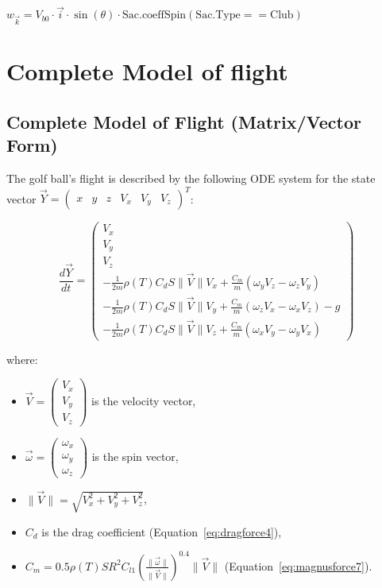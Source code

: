 \documentclass[10pt,a4paper]{report}
\begin{document}
$w_{\overrightarrow{k}} = V_{b0} \cdot \overrightarrow{i} \cdot \sin(\theta) \cdot \text{Sac.coeffSpin}(\text{Sac.Type} == \text{Club})$

\section{Complete Model of flight}
\subsection{Complete Model of Flight (Matrix/Vector Form)}
The golf ball's flight is described by the following ODE system for the state vector $\vec{Y} = \begin{pmatrix} x & y & z & V_x & V_y & V_z \end{pmatrix}^T$:

\begin{equation}
    \frac{d\vec{Y}}{dt} = \begin{pmatrix}
    V_x \\
    V_y \\
    V_z \\
    -\frac{1}{2m} \rho(T) C_d S \|\vec{V}\| V_x + \frac{C_m}{m} (\omega_y V_z - \omega_z V_y) \\
    -\frac{1}{2m} \rho(T) C_d S \|\vec{V}\| V_y + \frac{C_m}{m} (\omega_z V_x - \omega_x V_z) - g \\
    -\frac{1}{2m} \rho(T) C_d S \|\vec{V}\| V_z + \frac{C_m}{m} (\omega_x V_y - \omega_y V_x)
    \end{pmatrix}
    \label{eq:ode_system}
\end{equation}

\noindent
where:
\begin{itemize}
    \item $\vec{V} = \begin{pmatrix} V_x \\ V_y \\ V_z \end{pmatrix}$ is the velocity vector,
    \item $\vec{\omega} = \begin{pmatrix} \omega_x \\ \omega_y \\ \omega_z \end{pmatrix}$ is the spin vector,
    \item $\|\vec{V}\| = \sqrt{V_x^2 + V_y^2 + V_z^2}$,
    \item $C_d$ is the drag coefficient (Equation~\ref{eq:dragforce4}),
    \item $C_m = 0.5 \rho(T) S R^2 C_{l1} \left( \frac{\|\vec{\omega}\|}{\|\vec{V}\|} \right)^{0.4} \|\vec{V}\|$ (Equation~\ref{eq:magnusforce7}).
\end{itemize}
\end{document}
